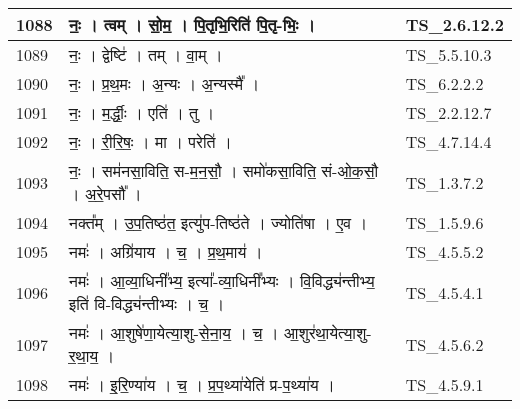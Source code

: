 \documentclass[17pt]{extarticle}
\begin{document}
\begin{longtable}{||p{0.4in}||p{4.9in}||p{0.9in}||}
    1088 & नः॒   ।   त्वम्   ।   सो॒म॒   ।   पि॒तृभि॒रिति॑ पि॒तृ{-}भिः॒   ।    & TS\_2.6.12.2       \\
    
    \hline
        
    1089 & नः॒   ।   द्वेष्टि॑   ।   तम्   ।   वा॒म्   ।    & TS\_5.5.10.3       \\
    
    \hline
        
    1090 & नः॒   ।   प्र॒थ॒मः   ।   अ॒न्यः   ।   अ॒न्यस्मै᳚   ।    & TS\_6.2.2.2       \\
    
    \hline
        
    1091 & नः॒   ।   म॒र्द्धीः॒   ।   एति॑   ।   तु   ।    & TS\_2.2.12.7       \\
    
    \hline
        
    1092 & नः॒   ।   री॒रि॒षः॒   ।   मा   ।   परेति॑   ।    & TS\_4.7.14.4       \\
    
    \hline
        
    1093 & नः॒   ।   सम॑नसा॒विति॒ स{-}म॒न॒सौ॒   ।   समो॑कसा॒विति॒ सं{-}ओ॒क॒सौ॒   ।   अ॒रे॒पसौ᳚   ।    & TS\_1.3.7.2       \\
    
    \hline
        
    1094 & नक्त᳚म्   ।   उ॒प॒तिष्ठ॑त॒ इत्यु॑प{-}तिष्ठ॑ते   ।   ज्योति॑षा   ।   ए॒व   ।    & TS\_1.5.9.6       \\
    
    \hline
        
    1095 & नमः॑   ।   अग्रि॑याय   ।   च॒   ।   प्र॒थ॒माय॑   ।    & TS\_4.5.5.2       \\
    
    \hline
        
    1096 & नमः॑   ।   आ॒व्या॒धिनी᳚भ्य॒ इत्या᳚{-}व्या॒धिनी᳚भ्यः   ।   वि॒विद्ध्य॑न्तीभ्य॒ इति॑ वि{-}विद्ध्य॑न्तीभ्यः   ।   च॒   ।    & TS\_4.5.4.1       \\
    
    \hline
        
    1097 & नमः॑   ।   आ॒शुषे॑णा॒येत्या॒शु{-}से॒ना॒य॒   ।   च॒   ।   आ॒शुर॑था॒येत्या॒शु{-}र॒था॒य॒   ।    & TS\_4.5.6.2       \\
    
    \hline
        
    1098 & नमः॑   ।   इ॒रि॒ण्या॑य   ।   च॒   ।   प्र॒प॒थ्या॑येति॑ प्र{-}प॒थ्या॑य   ।    & TS\_4.5.9.1       \\
    

\end{longtable}
\end{document}
